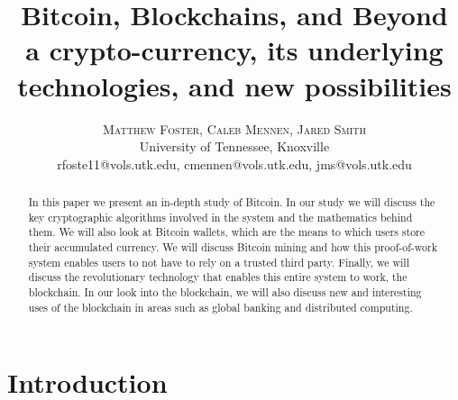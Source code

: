 \documentclass{article}
\title{\vspace{-15mm}\fontsize{24pt}{10pt}\selectfont\textbf{Bitcoin, Blockchains, and Beyond}\\\fontsize{12pt}{10pt}\textbf{a crypto-currency, its underlying technologies, and new possibilities}}
\author{
\large
\textsc{Matthew Foster, Caleb Mennen, Jared Smith}\\[2mm]
\normalsize University of Tennessee, Knoxville \\
\normalsize {rfoste11@vols.utk.edu, cmennen@vols.utk.edu, jms@vols.utk.edu}
\vspace{-5mm}
}
\date{}
\begin{document}
\null %
\nointerlineskip %
\vfill
\let\snewpage \newpage
\let\newpage \relax
\maketitle
\let \newpage \snewpage
\vfill 
\break %
\thispagestyle{fancy}

\newpage

\tableofcontents

\newpage


\begin{abstract}

In this paper we present an in-depth study of Bitcoin. In our study we will discuss the key cryptographic algorithms involved in the system and the mathematics behind them. We will also look at Bitcoin wallets, which are the means to which users store their accumulated currency. We will discuss Bitcoin mining and how this proof-of-work system enables users to not have to rely on a trusted third party. Finally, we will discuss the revolutionary technology that enables this entire system to work, the blockchain. In our look into the blockchain, we will also discuss new and interesting uses of the blockchain in areas such as global banking and distributed computing.

\end{abstract}


\section{Introduction}
\end{document}
